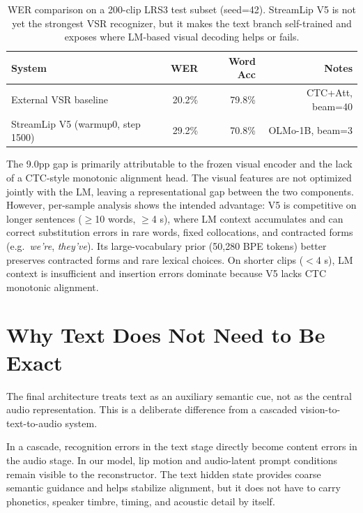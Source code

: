 \documentclass{article}
\begin{document}
\begin{table}[h]
\centering
\small
\begin{tabular}{@{}lrrr@{}}
\toprule
\textbf{System} & \textbf{WER} & \textbf{Word Acc} & \textbf{Notes} \\
\midrule
External VSR baseline & 20.2\% & 79.8\% & CTC+Att, beam=40 \\
StreamLip V5 (warmup0, step 1500) & 29.2\% & 70.8\% & OLMo-1B, beam=3 \\
\bottomrule
\end{tabular}
\caption{WER comparison on a 200-clip LRS3 test subset (seed=42). StreamLip
V5 is not yet the strongest VSR recognizer, but it makes the text branch
self-trained and exposes where LM-based visual decoding helps or fails.}
\label{tab:v5_wer}
\end{table}

The 9.0pp gap is primarily attributable to the frozen visual encoder and the
lack of a CTC-style monotonic alignment head. The visual features are not
optimized jointly with the LM, leaving a representational gap between the two
components. However, per-sample analysis shows the intended advantage: V5 is
competitive on longer sentences ($\geq$10 words, $\geq$4 s), where LM context
accumulates and can correct substitution errors in rare words, fixed
collocations, and contracted forms (e.g.\ \textit{we're}, \textit{they've}).
Its large-vocabulary prior (50{,}280 BPE tokens) better preserves contracted
forms and rare lexical choices. On shorter clips ($<$4 s), LM context is
insufficient and insertion errors dominate because V5 lacks CTC monotonic
alignment.

\section{Why Text Does Not Need to Be Exact}

The final architecture treats text as an auxiliary semantic cue, not as the
central audio representation. This is a deliberate difference from a cascaded
vision-to-text-to-audio system.

In a cascade, recognition errors in the text stage directly become content
errors in the audio stage. In our model, lip motion and audio-latent prompt
conditions remain visible to the reconstructor. The text hidden state provides
coarse semantic guidance and helps stabilize alignment, but it does not have to
carry phonetics, speaker timbre, timing, and acoustic detail by itself.
\end{document}
